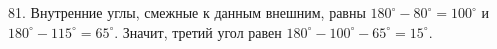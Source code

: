 81. Внутренние углы, смежные к данным внешним, равны $180^\circ-80^\circ=100^\circ$ и $180^\circ-115^\circ=65^\circ.$ Значит, третий угол равен $180^\circ-100^\circ-65^\circ=15^\circ.$\\
